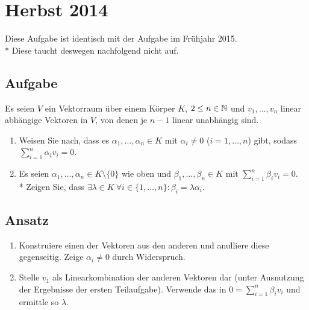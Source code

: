 \section{Herbst 2014}

\begin{remark}
	Diese Aufgabe ist identisch mit der Aufgabe im Frühjahr 2015. \\*
	Diese taucht deswegen nachfolgend nicht auf.
\end{remark}

\subsection{Aufgabe}
Es seien \( V \) ein Vektorraum über einem Körper \( K \), \( 2 \leq n \in \mathbb{N} \) und \( v_1, \dots, v_n \) linear abhängige Vektoren in \( V \), von denen je \( n-1 \) linear unabhängig sind.
\begin{enumerate}
	\item Weisen Sie nach, dass es \( \alpha_1, \dots, \alpha_n \in K \) mit \( \alpha_i \neq 0 \) (\( i = 1, \dots, n \)) gibt, sodass \( \sum_{i=1}^n\alpha_iv_i = 0 \).
	\item Es seien \( \alpha_1, \dots, \alpha_n \in K \setminus \{ 0 \} \) wie oben und \( \beta_1, \dots, \beta_n \in K \) mit \( \sum_{i=1}^n\beta_iv_i = 0 \). \\*
		Zeigen Sie, dass \( \exists \lambda \in K \ \forall i \in \{ 1, \dots, n \}: \beta_i = \lambda \alpha_i  \). 
\end{enumerate}

\subsection{Ansatz}
\begin{enumerate}
	\item Konstruiere einen der Vektoren aus den anderen und anulliere diese gegenseitig. Zeige \( \alpha_i \neq 0 \) durch Widerspruch.
	\item Stelle \( v_1 \) als Linearkombination der anderen Vektoren dar (unter Ausnutzung der Ergebnisse der ersten Teilaufgabe). Verwende das in \( 0 = \sum_{i=1}^n\beta_iv_i \) und ermittle so \( \lambda \).
\end{enumerate}

